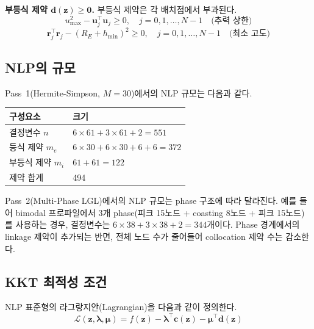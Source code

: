 \documentclass[11pt]{article}
\begin{document}
\textbf{부등식 제약 $\mathbf{d}(\mathbf{z}) \geq \mathbf{0}$.} 부등식 제약은 각 배치점에서 부과된다.
%
\begin{equation}\label{eq:thrust-bound}
u_{\max}^2 - \mathbf{u}_j^\top \mathbf{u}_j \geq 0, \quad j = 0, 1, \ldots, N-1 \quad \text{(추력 상한)}
\end{equation}
%
\begin{equation}\label{eq:altitude-bound}
\mathbf{r}_j^\top \mathbf{r}_j - (R_E + h_{\min})^2 \geq 0, \quad j = 0, 1, \ldots, N-1 \quad \text{(최소 고도)}
\end{equation}

\subsection{NLP의 규모}

Pass~1(Hermite-Simpson, $M = 30$)에서의 NLP 규모는 다음과 같다.

\begin{table}[h]
\centering
\begin{tabular}{@{}ll@{}}
\toprule
구성요소 & 크기 \\
\midrule
결정변수 $n$ & $6 \times 61 + 3 \times 61 + 2 = 551$ \\
등식 제약 $m_e$ & $6 \times 30 + 6 \times 30 + 6 + 6 = 372$ \\
부등식 제약 $m_i$ & $61 + 61 = 122$ \\
제약 합계 & 494 \\
\bottomrule
\end{tabular}
\end{table}

Pass~2(Multi-Phase LGL)에서의 NLP 규모는 phase 구조에 따라 달라진다. 예를 들어 bimodal 프로파일에서 3개 phase(피크 15노드 + coasting 8노드 + 피크 15노드)를 사용하는 경우, 결정변수는 $6 \times 38 + 3 \times 38 + 2 = 344$개이다. Phase 경계에서의 linkage 제약이 추가되는 반면, 전체 노드 수가 줄어들어 collocation 제약 수는 감소한다.

\subsection{KKT 최적성 조건}

NLP 표준형의 라그랑지안(Lagrangian)을 다음과 같이 정의한다.
%
\begin{equation}\label{eq:lagrangian}
\mathcal{L}(\mathbf{z}, \boldsymbol{\lambda}, \boldsymbol{\mu}) = f(\mathbf{z}) - \boldsymbol{\lambda}^\top \mathbf{c}(\mathbf{z}) - \boldsymbol{\mu}^\top \mathbf{d}(\mathbf{z})
\end{equation}
\end{document}

